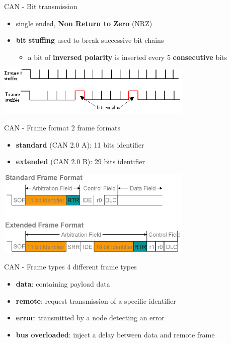 \begin{frame}{CAN - Bit transmission}
  \begin{itemize}
  \item single ended, \textbf{Non Return to Zero} (NRZ)
  \item \textbf{bit stuffing} used to break successive bit chains
    \begin{itemize}
    \item a bit of \textbf{inversed polarity} is inserted every 5 \textbf{consecutive} bits
    \end{itemize}
  \end{itemize}

  \smallskip
  \smallskip
  \begin{center}
    \includegraphics[width=0.7\textwidth]{figures/can_bit_stuffing.png}
  \end{center}
\end{frame}

\begin{frame}{CAN - Frame format}
  2 frame formats
  \begin{itemize}
  \item \textbf{standard} (CAN 2.0 A): 11 bits identifier
  \item \textbf{extended} (CAN 2.0 B): 29 bits identifier
  \end{itemize}

  \smallskip
  \begin{center}
    \includegraphics[width=0.7\textwidth]{figures/can_frame_format.jpg}
  \end{center}
\end{frame}

\begin{frame}{CAN - Frame types}
  4 different frame types
  \begin{itemize}
    \item \textbf{data}: containing payload data
    \item \textbf{remote}: request transmission of a specific identifier
    \item \textbf{error}: transmitted by a node detecting an error
    \item \textbf{bus overloaded}: inject a delay between data and remote frame
  \end{itemize}
\end{frame}

